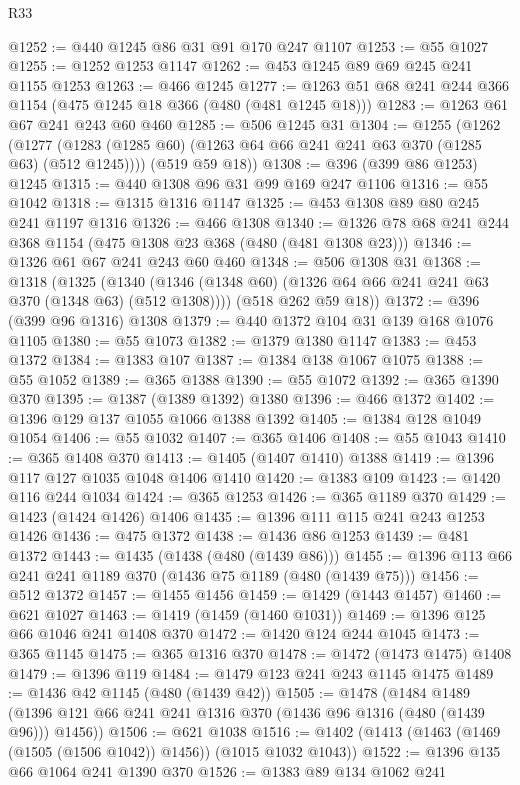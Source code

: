 \begin{lexlean}{R33}
\begin{coremodule}
@1252 := @440 @1245 @86 @31 @91 @170 @247 @1107
@1253 := @55 @1027
@1255 := @1252 @1253 @1147
@1262 := @453 @1245 @89 @69 @245 @241 @1155 @1253
@1263 := @466 @1245
@1277 := @1263 @51 @68 @241 @244 @366 @1154 (@475 @1245 @18 @366 (@480 (@481 @1245 @18)))
@1283 := @1263 @61 @67 @241 @243 @60 @460
@1285 := @506 @1245 @31
@1304 := @1255
    (@1262
      (@1277 (@1283 (@1285 @60) (@1263 @64 @66 @241 @241 @63 @370 (@1285 @63) (@512 @1245))))
      (@519 @59 @18))
@1308 := @396 (@399 @86 @1253) @1245
@1315 := @440 @1308 @96 @31 @99 @169 @247 @1106
@1316 := @55 @1042
@1318 := @1315 @1316 @1147
@1325 := @453 @1308 @89 @80 @245 @241 @1197 @1316
@1326 := @466 @1308
@1340 := @1326 @78 @68 @241 @244 @368 @1154 (@475 @1308 @23 @368 (@480 (@481 @1308 @23)))
@1346 := @1326 @61 @67 @241 @243 @60 @460
@1348 := @506 @1308 @31
@1368 := @1318
    (@1325
      (@1340 (@1346 (@1348 @60) (@1326 @64 @66 @241 @241 @63 @370 (@1348 @63) (@512 @1308))))
      (@518 @262 @59 @18))
@1372 := @396 (@399 @96 @1316) @1308
@1379 := @440 @1372 @104 @31 @139 @168 @1076 @1105
@1380 := @55 @1073
@1382 := @1379 @1380 @1147
@1383 := @453 @1372
@1384 := @1383 @107
@1387 := @1384 @138 @1067 @1075
@1388 := @55 @1052
@1389 := @365 @1388
@1390 := @55 @1072
@1392 := @365 @1390 @370
@1395 := @1387 (@1389 @1392) @1380
@1396 := @466 @1372
@1402 := @1396 @129 @137 @1055 @1066 @1388 @1392
@1405 := @1384 @128 @1049 @1054
@1406 := @55 @1032
@1407 := @365 @1406
@1408 := @55 @1043
@1410 := @365 @1408 @370
@1413 := @1405 (@1407 @1410) @1388
@1419 := @1396 @117 @127 @1035 @1048 @1406 @1410
@1420 := @1383 @109
@1423 := @1420 @116 @244 @1034
@1424 := @365 @1253
@1426 := @365 @1189 @370
@1429 := @1423 (@1424 @1426) @1406
@1435 := @1396 @111 @115 @241 @243 @1253 @1426
@1436 := @475 @1372
@1438 := @1436 @86 @1253
@1439 := @481 @1372
@1443 := @1435 (@1438 (@480 (@1439 @86)))
@1455 := @1396 @113 @66 @241 @241 @1189 @370 (@1436 @75 @1189 (@480 (@1439 @75)))
@1456 := @512 @1372
@1457 := @1455 @1456
@1459 := @1429 (@1443 @1457)
@1460 := @621 @1027
@1463 := @1419 (@1459 (@1460 @1031))
@1469 := @1396 @125 @66 @1046 @241 @1408 @370
@1472 := @1420 @124 @244 @1045
@1473 := @365 @1145
@1475 := @365 @1316 @370
@1478 := @1472 (@1473 @1475) @1408
@1479 := @1396 @119
@1484 := @1479 @123 @241 @243 @1145 @1475
@1489 := @1436 @42 @1145 (@480 (@1439 @42))
@1505 := @1478
    (@1484 @1489 (@1396 @121 @66 @241 @241 @1316 @370 (@1436 @96 @1316 (@480 (@1439 @96))) @1456))
@1506 := @621 @1038
@1516 := @1402 (@1413 (@1463 (@1469 (@1505 (@1506 @1042)) @1456)) (@1015 @1032 @1043))
@1522 := @1396 @135 @66 @1064 @241 @1390 @370
@1526 := @1383 @89 @134 @1062 @241

\end{coremodule}
\end{lexlean}
